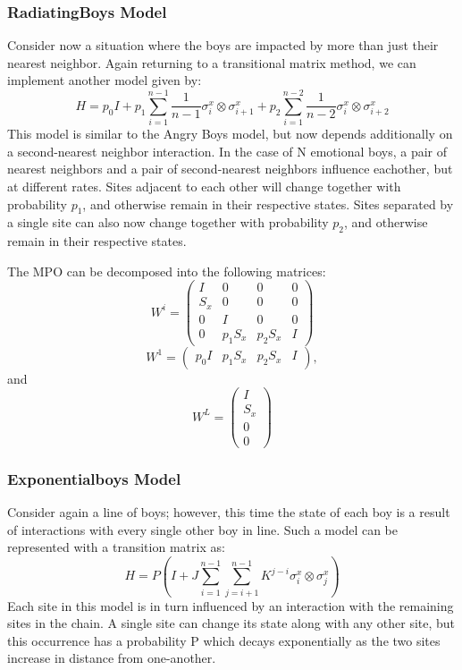 \documentclass[english]{article}
\begin{document}
\subsubsection{RadiatingBoys Model}
Consider now a situation where the boys are impacted by more than just their nearest neighbor. Again returning to a transitional matrix method, we can implement another model given by:
\begin{displaymath}
H=p_0 I + p_1 \sum_{i=1}^{n-1}\frac{1}{n-1}\sigma_i^x\otimes\sigma_{i+1}^x + p_2 \sum_{i=1}^{n-2}\frac{1}{n-2}\sigma_i^x\otimes\sigma_{i+2}^x
\end{displaymath}
This model is similar to the Angry Boys model, but now depends additionally on a second-nearest neighbor interaction. In the case of N emotional boys, a pair of nearest neighbors and a pair of second-nearest neighbors influence eachother, but at different rates. Sites adjacent to each other will change together with probability $p_{1}$, and otherwise remain in their respective states. Sites separated by a single site can also now change together with  probability $p_{2}$, and otherwise remain in their respective states.


The MPO can be decomposed into the following matrices:
$$
W^{i}=
\begin{pmatrix}
I & 0 & 0 & 0 \\
S_x & 0 & 0 & 0 \\
0 & I & 0 & 0 \\
0 & p_1 S_x & p_2 S_x & I
\end{pmatrix}
$$
 $$W^1=\begin{pmatrix}p_0 I & p_1 S_x & p_2 S_x & I\end{pmatrix}, $$ 
and 
$$W^L=
\begin{pmatrix}
I \\ S_x \\ 0 \\0
\end{pmatrix}$$


\subsubsection{Exponentialboys Model}
Consider again a line of boys; however, this time the state of each boy is a result of interactions with every single other boy in line. Such a model can be represented with a  transition matrix as:
\begin{displaymath}
H = P (I + J \sum_{i=1}^{n-1} \sum_{j=i+1}^{n-1} K^{j-i}\sigma_i^x\otimes\sigma_j^x)
\end{displaymath}
Each site in this model is in turn influenced by an interaction with the remaining sites in the chain. A single site can change its state along with any other site, but this occurrence has a probability P which decays exponentially as the two sites increase in distance from one-another.
\end{document}
